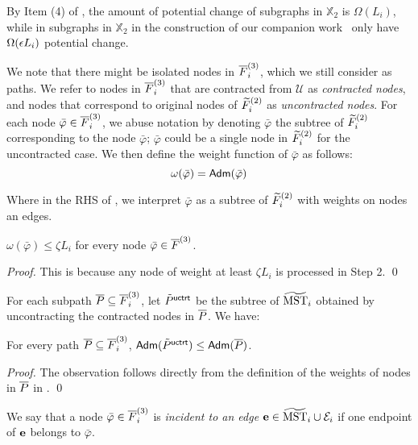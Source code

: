 By Item (4) of , the amount of potential change of subgraphs in $\mathbb{X}_2$ is $\Omega(L_i)$, while in subgraphs in $\mathbb{X}_2$ in the construction of our companion work~\cite{LS21} only have $\Omega(\epsilon L_i)$ potential change. 

We note that there might be isolated nodes in $\overline{F}^{(3)}_i$, which we still consider as paths.  We refer to nodes in $\overline{F}^{(3)}_i$ that are contracted from $\mathcal{U}$ as \emph{contracted nodes},  and nodes that correspond to original nodes of $\widetilde{F}^{(2)}_i$ as \emph{uncontracted nodes}. For each node $\bar{\varphi} \in \overline{F}^{(3)}_i$, we abuse notation by denoting $\bar{\varphi}$ the subtree of $\widetilde{F}^{(2)}_i$ corresponding to the node $\bar{\varphi}$; $\bar{\varphi}$  could be a single node in $\widetilde{F}^{(2)}_i$ for the uncontracted case. We then define the weight function of $\bar{\varphi}$ as follows:
\begin{equation}\label{eq:weightContractedNode}
	\omega(\bar{\varphi}) = \mathsf{Adm}(\bar{\varphi})
\end{equation}

Where in the RHS of , we interpret $\bar{\varphi}$ as a subtree of $\widetilde{F}^{(2)}_i$ with weights on nodes an edges. 
\begin{observation}\label{obs::weightContractedNode} $\omega(\bar{\varphi}) \leq  \zeta L_i $ for every node $\bar{\varphi} \in \overline{F}^{(3)}$.
\end{observation}
\begin{proof}
	This is because any node of weight at least $\zeta L_i$ is processed in Step 2. \qed
\end{proof}
For each subpath $\overline{P} \subseteq \overline{F}^{(3)}_i$, let $\tilde{P}^{\mathsf{uctrt}}$ be the subtree of $\widetilde{\mathrm{MST}}_{i}$ obtained by uncontracting the contracted nodes in $\overline{P}$. We have:

\begin{observation}\label{obs:contrct-uncontract}   For every path $\overline{P} \subseteq \overline{F}^{(3)}_i$,  $\mathsf{Adm}(\tilde{P}^{\mathsf{uctrt}}) \leq \mathsf{Adm}(\overline{P})$.
\end{observation}
\begin{proof} The observation follows directly from the definition of the weights of nodes in $\overline{P}$ in . \qed
\end{proof}

We say that a node $\bar{\varphi} \in \overline{F}^{(3)}_i$ is \emph{incident to an edge} $\mathbf{e} \in \widetilde{\mathrm{MST}}_{i}\cup \mathcal{E}_i$ if one endpoint of $\mathbf{e}$ belongs to $\bar{\varphi}$. 


